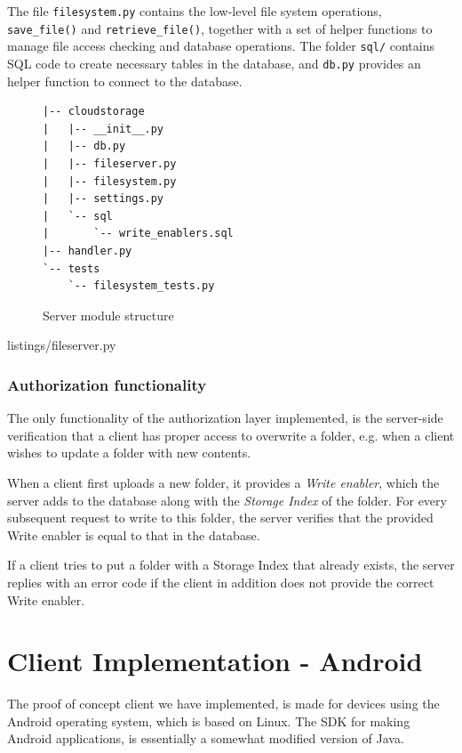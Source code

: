 \documentclass[pdftex,english,10pt,b5paper,twoside]{book}
\begin{document}
The file \texttt{filesystem.py} contains the low-level file system operations,
\texttt{save\_file()} and \texttt{retrieve\_file()}, together with a set of
helper functions to manage file access checking and database operations.  The
folder \texttt{sql/} contains \ac{SQL} code to create necessary tables in the
database, and \texttt{db.py} provides an helper function to connect to the
database.

\begin{figure}[h!]
\begin{verbatim}
|-- cloudstorage
|   |-- __init__.py
|   |-- db.py
|   |-- fileserver.py
|   |-- filesystem.py
|   |-- settings.py
|   `-- sql
|       `-- write_enablers.sql
|-- handler.py
`-- tests
    `-- filesystem_tests.py
\end{verbatim}
    \caption{Server module structure}
    \label{fig:IM:layout}
\end{figure}


{listings/fileserver.py}

\subsubsection{Authorization functionality}

The only functionality of the authorization layer implemented, is the
server-side verification that a client has proper access to overwrite a folder,
e.g. when a client wishes to update a folder with new contents.

When a client first uploads a new folder, it provides a \emph{Write enabler},
which the server adds to the database along with the \emph{Storage Index} of
the folder.  For every subsequent request to write to this folder, the server
verifies that the provided Write enabler is equal to that in the database.

If a client tries to put a folder with a Storage Index that already exists, the
server replies with an error code if the client in addition does not provide
the correct Write enabler.

\section{Client Implementation - Android}

The proof of concept client we have implemented, is made for devices using the
Android operating system, which is based on Linux. The \ac{SDK} for making
Android applications, is essentially a somewhat modified version of Java.
\end{document}
